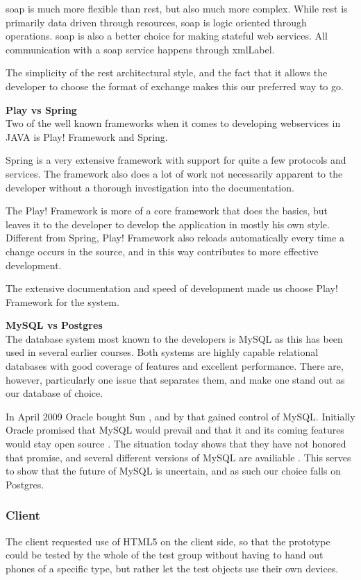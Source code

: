 \documentclass[11pt]{book}
\begin{document}
\gls{soap} is much more flexible than \gls{rest}, but also much more complex. While \gls{rest} is primarily data driven through resources, \gls{soap} is logic oriented through operations. \gls{soap} is also a better choice for making stateful web services. All communication with a \gls{soap} service happens through \gls{xmlLabel}.

The simplicity of the \gls{rest} architectural style, and the fact that it allows the developer to choose the format of exchange makes this our preferred way to go.

\textbf{Play vs Spring}\\
Two of the well known frameworks when it comes to developing webservices in JAVA is Play! Framework and Spring.

Spring is a very extensive framework with support for quite a few protocols and services. The framework also does a lot of work not necessarily apparent to the developer without a thorough investigation into the documentation.

The Play! Framework is more of a core framework that does the basics, but leaves it to the developer to develop the application in mostly his own style. Different from Spring, Play! Framework also reloads automatically every time a change occurs in the source, and in this way contributes to more effective development.

The extensive documentation and speed of development made us choose Play! Framework for the system.

\textbf{MySQL vs Postgres}\\
The database system most known to the developers is MySQL as this has been used in several earlier courses. Both systems are highly capable relational databases with good coverage of features and excellent performance. There are, however, particularly one issue that separates them, and make one stand out as our database of choice.

In April 2009 Oracle bought Sun \cite{sun}, and by that gained control of MySQL. Initially Oracle promised that MySQL would prevail and that it and its coming features would stay open source \cite{mysql}. The situation today shows that they have not honored that promise, and several different versions of MySQL are availiable \cite{mysqlproducts}. This serves to show that the future of MySQL is uncertain, and as such our choice falls on Postgres.

\subsubsection{Client}
The client requested use of HTML5 on the client side, so that the prototype could be tested by the whole of the test group without having to hand out phones of a specific type, but rather let the test objects use their own devices.
\end{document}
